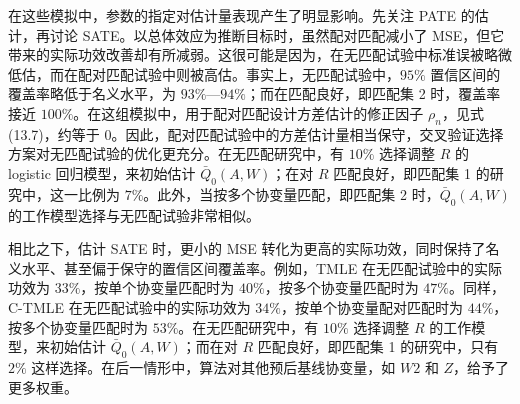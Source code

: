 在这些模拟中，参数的指定对估计量表现产生了明显影响。先关注 PATE 的估计，再讨论 SATE。以总体效应为推断目标时，虽然配对匹配减小了 MSE，但它带来的实际功效改善却有所减弱。这很可能是因为，在无匹配试验中标准误被略微低估，而在配对匹配试验中则被高估。事实上，无匹配试验中，$95\%$ 置信区间的覆盖率略低于名义水平，为 $93\%$—$94\%$；而在匹配良好，即匹配集 2 时，覆盖率接近 $100\%$。在这组模拟中，用于配对匹配设计方差估计的修正因子 $\rho_n$，见式 (13.7)，约等于 $0$。因此，配对匹配试验中的方差估计量相当保守，交叉验证选择方案对无匹配试验的优化更充分。在无匹配研究中，有 $10\%$ 选择调整 $R$ 的 logistic 回归模型，来初始估计 $\bar Q_0(A,W)$；在对 $R$ 匹配良好，即匹配集 1 的研究中，这一比例为 $7\%$。此外，当按多个协变量匹配，即匹配集 2 时，$\bar Q_0(A,W)$ 的工作模型选择与无匹配试验非常相似。

相比之下，估计 SATE 时，更小的 MSE 转化为更高的实际功效，同时保持了名义水平、甚至偏于保守的置信区间覆盖率。例如，TMLE 在无匹配试验中的实际功效为 $33\%$，按单个协变量匹配时为 $40\%$，按多个协变量匹配时为 $47\%$。同样，C-TMLE 在无匹配试验中的实际功效为 $34\%$，按单个协变量配对匹配时为 $44\%$，按多个协变量匹配时为 $53\%$。在无匹配研究中，有 $10\%$ 选择调整 $R$ 的工作模型，来初始估计 $\bar Q_0(A,W)$；而在对 $R$ 匹配良好，即匹配集 1 的研究中，只有 $2\%$ 这样选择。在后一情形中，算法对其他预后基线协变量，如 $W2$ 和 $Z$，给予了更多权重。
\FloatBarrier

